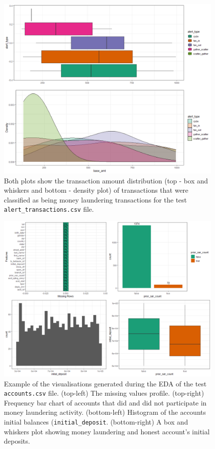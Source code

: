 \begin{figure}[]
	\begin{center}
		\includegraphics[scale=0.5]{fig/CH3/test_alrt_trans_tx_amount_alert_type_distribution.jpg}
		\caption{Both plots show the transaction amount distribution (top - box and whiskers and bottom - density plot) of transactions that were classified as being money laundering transactions for the test \texttt{alert\_transactions.csv} file.}
		\label{fig:ch3_raw_eda_test_alrt_trans_tx_distr}
	\end{center}	
\end{figure}

\begin{figure}[]
	\begin{center}
		\includegraphics[scale=0.5]{fig/CH3/test_acc_summary.png}
		\caption{Example of the visualisations generated during the EDA of the test \texttt{accounts.csv} file. (top-left) The missing values profile. (top-right) Frequency bar chart of accounts that did and did not participate in money laundering activity. (bottom-left) Histogram of the accounts initial balances (\texttt{initial\_deposit}. (bottom-right) A box and whiskers plot showing money laundering and honest account's initial deposits.}
		\label{fig:ch3_raw_eda_test_acct_sum}
	\end{center}	
\end{figure}


